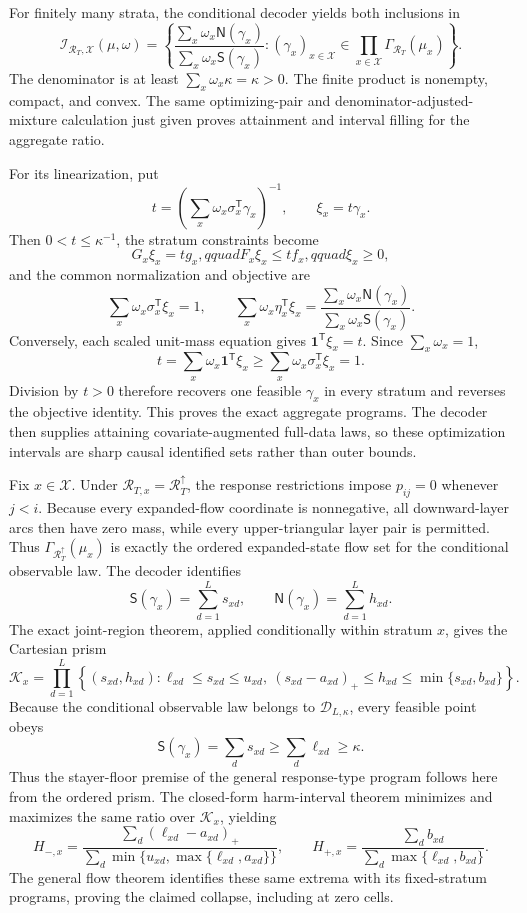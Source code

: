 For finitely many strata, the conditional decoder yields both inclusions in
\[
 \mathcal I_{\mathcal R_T,\mathcal X}(\mu,\omega)
 =\left\{
 \frac{\sum_x\omega_x\mathsf N(\gamma_x)}
 {\sum_x\omega_x\mathsf S(\gamma_x)}:
 (\gamma_x)_{x\in\mathcal X}\in
 \prod_{x\in\mathcal X}\Gamma_{\mathcal R_T}(\mu_x)
 \right\}.
\]
The denominator is at least \(\sum_x\omega_x\kappa=\kappa>0\).  The finite product is nonempty, compact, and convex.  The same optimizing-pair and denominator-adjusted-mixture calculation just given proves attainment and interval filling for the aggregate ratio.

For its linearization, put
\[
 t=\left(\sum_x\omega_x\sigma_x^{\mathsf T}\gamma_x\right)^{-1},
 \qquad
 \xi_x=t\gamma_x.
\]
Then \(0<t\le\kappa^{-1}\), the stratum constraints become
\[
 G_x\xi_x=tg_x,qquad
 F_x\xi_x\le tf_x,qquad
 \xi_x\ge0,
\]
and the common normalization and objective are
\[
 \sum_x\omega_x\sigma_x^{\mathsf T}\xi_x=1,
 \qquad
 \sum_x\omega_x\eta_x^{\mathsf T}\xi_x
 =\frac{\sum_x\omega_x\mathsf N(\gamma_x)}
 {\sum_x\omega_x\mathsf S(\gamma_x)}.
\]
Conversely, each scaled unit-mass equation gives \(\mathbf 1^{\mathsf T}\xi_x=t\).  Since \(\sum_x\omega_x=1\),
\[
 t=\sum_x\omega_x\mathbf 1^{\mathsf T}\xi_x
 \ge\sum_x\omega_x\sigma_x^{\mathsf T}\xi_x=1.
\]
Division by \(t>0\) therefore recovers one feasible \(\gamma_x\) in every stratum and reverses the objective identity.  This proves the exact aggregate programs.  The decoder then supplies attaining covariate-augmented full-data laws, so these optimization intervals are sharp causal identified sets rather than outer bounds.

Fix \(x\in\mathcal X\).  Under \(\mathcal R_{T,x}=\mathcal R_T^{\uparrow}\), the response restrictions impose \(p_{ij}=0\) whenever \(j<i\).  Because every expanded-flow coordinate is nonnegative, all downward-layer arcs then have zero mass, while every upper-triangular layer pair is permitted.  Thus \(\Gamma_{\mathcal R_T^{\uparrow}}(\mu_x)\) is exactly the ordered expanded-state flow set for the conditional observable law.  The decoder identifies
\[
 \mathsf S(\gamma_x)=\sum_{d=1}^{L}s_{xd},
 \qquad
 \mathsf N(\gamma_x)=\sum_{d=1}^{L}h_{xd}.
\]
The exact joint-region theorem, applied conditionally within stratum \(x\), gives the Cartesian prism
\[
 \mathcal K_x=
 \prod_{d=1}^{L}
 \left\{(s_{xd},h_{xd}):
 \ell_{xd}\le s_{xd}\le u_{xd},\ 
 (s_{xd}-a_{xd})_+\le h_{xd}
 \le\min\{s_{xd},b_{xd}\}\right\}.
\]
Because the conditional observable law belongs to \(\mathcal D_{L,\kappa}\), every feasible point obeys
\[
 \mathsf S(\gamma_x)=\sum_ds_{xd}
 \ge\sum_d\ell_{xd}\ge\kappa.
\]
Thus the stayer-floor premise of the general response-type program follows here from the ordered prism.  The closed-form harm-interval theorem minimizes and maximizes the same ratio over \(\mathcal K_x\), yielding
\[
 H_{-,x}=
 \frac{\sum_d(\ell_{xd}-a_{xd})_+}
 {\sum_d\min\{u_{xd},\max\{\ell_{xd},a_{xd}\}\}},
 \qquad
 H_{+,x}=
 \frac{\sum_db_{xd}}
 {\sum_d\max\{\ell_{xd},b_{xd}\}}.
\]
The general flow theorem identifies these same extrema with its fixed-stratum programs, proving the claimed collapse, including at zero cells.

